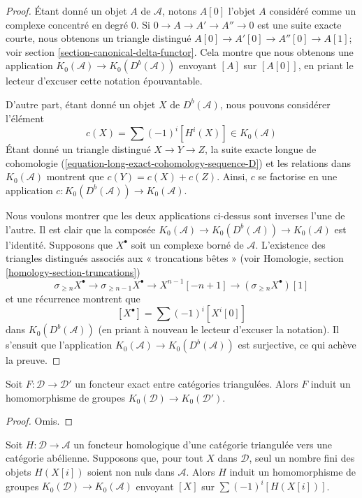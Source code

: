 \begin{proof}
Étant donné un objet $A$ de $\mathcal{A}$, notons $A[0]$ l'objet $A$
considéré comme un complexe concentré en degré $0$.
Si $0 \to A \to A' \to A'' \to 0$ est une suite exacte courte, nous obtenons
un triangle distingué $A[0] \to A'[0] \to A''[0] \to A[1]$; voir
section \ref{section-canonical-delta-functor}.
Cela montre que nous obtenons une application
$K_0(\mathcal{A}) \to K_0(D^b(\mathcal{A}))$ envoyant $[A]$ sur $[A[0]]$,
en priant le lecteur d'excuser cette notation épouvantable.

\medskip\noindent
D'autre part, étant donné un objet $X$ de $D^b(\mathcal{A})$, nous pouvons
considérer l'élément
$$
c(X) = \sum (-1)^i[H^i(X)] \in K_0(\mathcal{A})
$$
Étant donné un triangle distingué $X \to Y \to Z$, la suite exacte longue
de cohomologie (\ref{equation-long-exact-cohomology-sequence-D}) et les
relations dans $K_0(\mathcal{A})$ montrent que $c(Y) = c(X) + c(Z)$.
Ainsi, $c$ se factorise en une application
$c : K_0(D^b(\mathcal{A})) \to K_0(\mathcal{A})$.

\medskip\noindent
Nous voulons montrer que les deux applications ci-dessus sont inverses l'une
de l'autre. Il est clair que la composée $K_0(\mathcal{A}) \to
K_0(D^b(\mathcal{A})) \to K_0(\mathcal{A})$ est l'identité.
Supposons que $X^\bullet$ soit un complexe borné de $\mathcal{A}$.
L'existence des triangles distingués associés aux « troncations bêtes » (voir
Homologie, section \ref{homology-section-truncations})
$$
\sigma_{\geq n}X^\bullet \to \sigma_{\geq n - 1}X^\bullet \to
X^{n - 1}[-n + 1] \to (\sigma_{\geq n}X^\bullet)[1]
$$
et une récurrence montrent que
$$
[X^\bullet] = \sum (-1)^i[X^i[0]]
$$
dans $K_0(D^b(\mathcal{A}))$ (en priant à nouveau le lecteur d'excuser la
notation). Il s'ensuit que l'application
$K_0(\mathcal{A}) \to K_0(D^b(\mathcal{A}))$ est surjective, ce qui achève
la preuve.
\end{proof}

\begin{lemma}
\label{lemma-map-K}
Soit $F : \mathcal{D} \to \mathcal{D}'$ un foncteur exact entre catégories
triangulées. Alors $F$ induit un homomorphisme de groupes
$K_0(\mathcal{D}) \to K_0(\mathcal{D}')$.
\end{lemma}

\begin{proof}
Omis.
\end{proof}

\begin{lemma}
\label{lemma-homological-map-K}
Soit $H : \mathcal{D} \to \mathcal{A}$ un foncteur homologique d'une catégorie
triangulée vers une catégorie abélienne. Supposons que, pour tout $X$ dans
$\mathcal{D}$, seul un nombre fini des objets $H(X[i])$ soient non nuls dans
$\mathcal{A}$. Alors $H$ induit un homomorphisme de groupes
$K_0(\mathcal{D}) \to K_0(\mathcal{A})$ envoyant $[X]$ sur
$\sum (-1)^i[H(X[i])]$.
\end{lemma}

